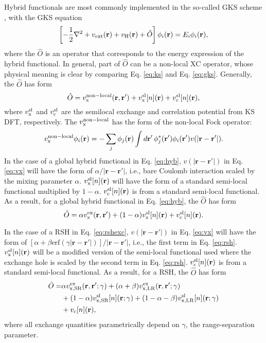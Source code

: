 \documentclass[aip, amsmath, amssymb, reprint, longbibliography]{revtex4-2}
\def\mr{\mathbf{r}}
\begin{document}
Hybrid functionals are most commonly implemented in the so-called GKS scheme \cite{SGVM96}, with the GKS equation
\begin{equation}
\left[-\frac{1}{2}\nabla^2+v_{\rm ext}(\mr)+v_{\rm H}(\mr)+\hat{O}\right]\phi_i(\mr)=E_i\phi_i(\mr),
\label{eq:gks}
\end{equation}
where the $\hat{O}$ is an operator that corresponds to the energy expression of the hybrid functional. In general, part of $\hat{O}$ can be a non-local XC operator, whose physical meaning is clear by comparing Eq. \eqref{eq:ks} and Eq. \eqref{eq:gks}. Generally, the $\hat{O}$ has form
\begin{equation}
\hat{O}=v_{\rm x}^{\rm non-local}(\mr,\mr')+v_{\rm x}^{\rm sl}[n](\mr)+v_{\rm c}^{\rm sl}[n](\mr),
\label{eq:ohyb}
\end{equation}
where $v_{\rm x}^{\rm sl}$ and $v_{\rm c}^{\rm sl}$ are the semilocal exchange and correlation potential from KS DFT, respectively. The $v_{\rm x}^{\rm non-local}$ has the form of the non-local Fock operator:
\begin{equation}
v_{\rm x}^{\rm non-local}\phi_i(\mr)=-\sum_j\phi_j(\mr)\int d\mr'\,\phi_j^*(\mr')\phi_i(\mr')v(|\mr-\mr'|).
\label{eq:vx}
\end{equation}
In the case of a global hybrid functional in Eq. \eqref{eq:hyb}, $v(|\mr-\mr'|)$ in Eq. \eqref{eq:vx} will have the form of $\alpha/|\mr-\mr'|$, i.e., bare Coulomb interaction scaled by the mixing parameter $\alpha$. $v_{\rm x}^{\rm sl}[n](\mr)$ will have the form of a standard semi-local functional multiplied by $1-\alpha$. $v_{\rm c}^{\rm sl}[n](\mr)$ is from a standard semi-local functional. As a result, for a global hybrid functional in Eq. \eqref{eq:hyb}, the $\hat{O}$ has form
\begin{equation}
\hat{O}=\alpha v_{\rm x}^{\rm ex}(\mr,\mr')+(1-\alpha)v_{\rm x}^{\rm sl}[n](\mr)+v_{\rm c}^{\rm sl}[n](\mr).
\label{eq:ohybfr}
\end{equation}

In the case of a RSH in Eq. \eqref{eq:rshexc}, $v(|\mr-\mr'|)$ in Eq. \eqref{eq:vx} will have the form of $[\alpha+\beta \mbox{erf}(\gamma |\mr-\mr'|)]/|\mr-\mr'|$, i.e., the first term in Eq. \eqref{eq:rsh}. $v_{\rm x}^{\rm sl}[n](\mr)$ will be a modified version of the semi-local functional used where the exchange hole is scaled \cite{HSE03} by the second term in Eq. \eqref{eq:rsh}. $v_{\rm c}^{\rm sl}[n](\mr)$ is from a standard semi-local functional. As a result, for a RSH, the $\hat{O}$ has form
\begin{equation}
\begin{split}
\hat{O}= & \alpha v_{\rm x,SR}^{\rm ex}(\mr,\mr';\gamma)+(\alpha+\beta) v_{\rm x,LR}^{\rm ex}(\mr,\mr';\gamma) \\
& + (1-\alpha) v_{\rm x,SR}^{\rm sl}[n](\mr;\gamma)+(1-\alpha-\beta) v_{\rm x,LR}^{\rm sl}[n](\mr;\gamma) \\
& +v_{\rm c}[n](\mr), \\
\label{eq:ohybrsh}
\end{split}
\end{equation}
where all exchange quantities parametrically depend on $\gamma$, the range-separation parameter.
\end{document}
